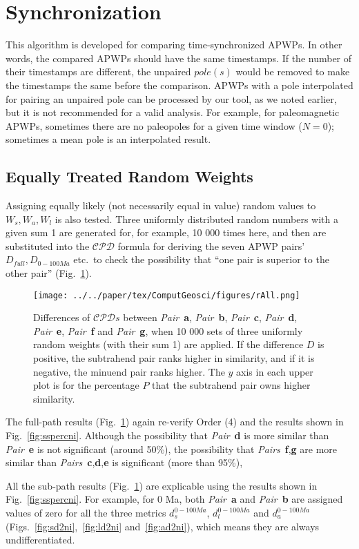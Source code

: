 \section{Synchronization}
This algorithm is developed for comparing time-synchronized APWPs. In other
words, the compared APWPs should have the same timestamps. If the number of
their timestamps are different, the unpaired $pole(s)$ would be removed to make
the timestamps the same before the comparison. APWPs with a pole interpolated
for pairing an unpaired pole can be processed by our tool, as we noted earlier,
but it is not recommended for a valid analysis. For example, for paleomagnetic
APWPs, sometimes there are no paleopoles for a given time window ($N=0$);
sometimes a mean pole is an interpolated result.

\subsection{Equally Treated Random Weights}
Assigning equally likely (not necessarily equal in value) random values to
$W_s,W_a,W_l$ is also tested. Three uniformly distributed random numbers with a
given sum 1 are generated for, for example, 10 000 times here, and then are
substituted into the $\mathcal{CPD}$ formula for deriving the seven APWP
pairs' $D_{full},D_{0-100Ma}$ etc.\ to check the possibility that ``one pair is
superior to the other pair'' (Fig.~\ref{fig:rall}).

\begin{figure}[!ht]
\centering
\texttt{[image: ../../paper/tex/ComputGeosci/figures/rAll.png]}
\caption[Comparisons of Pairs a-g with random weights involved]{Differences of
$\mathcal{CPD}s$ between \emph{Pair}~\textbf{a}, \emph{Pair}~\textbf{b},
\emph{Pair}~\textbf{c}, \emph{Pair}~\textbf{d}, \emph{Pair}~\textbf{e},
\emph{Pair}~\textbf{f} and \emph{Pair}~\textbf{g}, when 10 000 sets of three
uniformly random weights (with
their sum 1) are applied. If the difference $D$ is positive, the subtrahend pair
ranks higher in similarity, and if it is negative, the minuend pair ranks
higher. The $y$ axis in each upper plot is for the percentage $P$ that the
subtrahend pair owns higher similarity.}\label{fig:rall}
\end{figure}

The full-path results (Fig.~\ref{fig:rall}) again re-verify Order (4) and
the results shown in Fig.~\ref{fig:sspercni}. Although the possibility that
\emph{Pair}~\textbf{d} is more similar than \emph{Pair}~\textbf{e} is not
significant (around 50\%), the possibility that
\emph{Pairs}~\textbf{f},\textbf{g} are more similar than
\emph{Pairs}~\textbf{c},\textbf{d},\textbf{e} is significant (more than 95\%),

All the sub-path results (Fig.~\ref{fig:rall}) are explicable using the results
shown in Fig.~\ref{fig:sspercni}. For example, for 0 Ma, both
\emph{Pair}~\textbf{a} and \emph{Pair}~\textbf{b} are assigned values of zero
for all the three metrics $d_s^{0-100Ma}$, $d_l^{0-100Ma}$ and $d_a^{0-100Ma}$
(Figs.~\ref{fig:sd2ni},~\ref{fig:ld2ni} and~\ref{fig:ad2ni}), which means they
are always undifferentiated.
